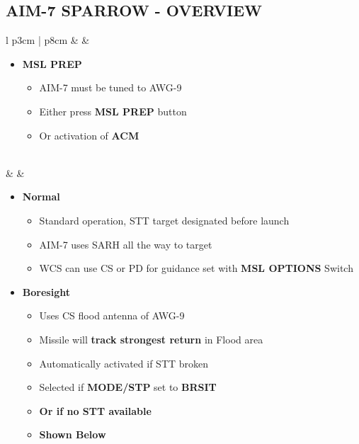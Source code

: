 \documentclass[8pt,usenames,dvipsnames,twoside]{article}
\begin{document}
		\subsection{AIM-7 SPARROW - OVERVIEW}
		\begin{center}
			\begin{longtable}{l p{3cm} | p{8cm}}
				\toprule
				\textbullet &  & 
				\begin{minipage}[t]{\linewidth}
					\vspace{-7pt}
					\begin{itemize}
						\item \textbf{MSL PREP}
						\begin{itemize}
							\item AIM-7 must be tuned to AWG-9
							\item Either press \textbf{MSL PREP} button
							\item Or activation of \textbf{ACM}
						\end{itemize} 
					\end{itemize} 
				\end{minipage} \\
				\midrule
				\textbullet &  & 
				\begin{minipage}[t]{\linewidth}
					\vspace{-7pt}
					\begin{itemize}
						\item \textbf{Normal} 
						\begin{itemize}
							\item Standard operation, STT target designated before launch
							\item AIM-7 uses SARH all the way to target
							\item WCS can use CS or PD for guidance set with \textbf{MSL OPTIONS} Switch
						\end{itemize}
						\item \textbf{Boresight}
						\begin{itemize}
							\item Uses CS flood antenna of AWG-9
							\item Missile will \textbf{track strongest return} in Flood area
							\item Automatically activated if STT broken
							\item Selected if \textbf{MODE/STP} set to \textbf{BRSIT}
							\item \textbf{Or if no STT available}
							\item \textbf{Shown Below}

\end{itemize}
\end{itemize}
\end{minipage}
\end{longtable}
\end{center}
\end{document}
